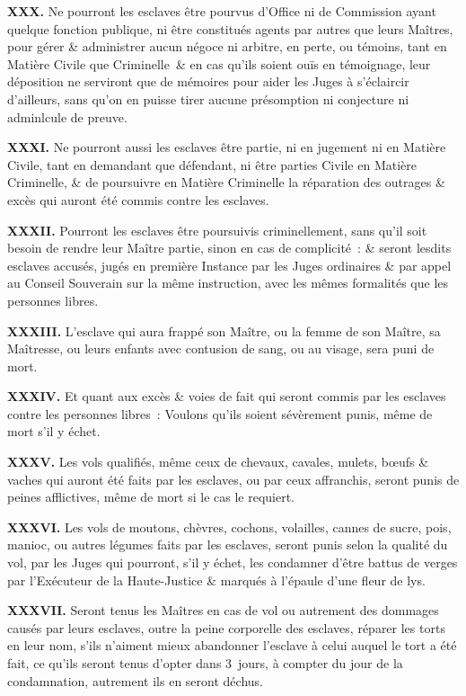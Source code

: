 \documentclass[french,twoside]{book} %
\newcommand{\labelchar}[1]{\textbf{\color{rubric} #1}}
\begin{document}
\labelchar{XXX.} Ne pourront les esclaves être pourvus d’Office ni de Commission ayant quelque fonction publique, ni être constitués agents par autres que leurs Maîtres, pour gérer \& administrer aucun négoce ni arbitre, en perte, ou témoins, tant en Matière Civile que Criminelle \& en cas qu’ils soient ouïs en témoignage, leur déposition ne serviront que de mémoires pour aider les Juges à s’éclaircir d’ailleurs, sans qu’on en puisse tirer aucune présomption ni conjecture ni adminlcule de preuve.\par
\labelchar{XXXI.} Ne pourront aussi les esclaves être partie, ni en jugement ni en Matière Civile, tant en demandant que défendant, ni être parties Civile en Matière Criminelle, \& de poursuivre en Matière Criminelle la réparation des outrages \& excès qui auront été commis contre les esclaves.\par
\labelchar{XXXII.} Pourront les esclaves être poursuivis criminellement, sans qu’il soit besoin de rendre leur Maître partie, sinon en cas de complicité : \& seront lesdits esclaves accusés, jugés en première Instance par les Juges ordinaires \& par appel au Conseil Souverain sur la même instruction, avec les mêmes formalités que les personnes libres.\par
\labelchar{XXXIII.} L’esclave qui aura frappé son Maître, ou la femme de son Maître, sa Maîtresse, ou leurs enfants avec contusion de sang, ou au visage, sera puni de mort.\par
\labelchar{XXXIV.} Et quant aux excès \& voies de fait qui seront commis par les esclaves contre les personnes libres : Voulons qu’ils soient sévèrement punis, même de mort s’il y échet.\par
\labelchar{XXXV.} Les vols qualifiés, même ceux de chevaux, cavales, mulets, bœufs \& vaches qui auront été faits par les esclaves, ou par ceux affranchis, seront punis de peines afflictives, même de mort si le cas le requiert.\par
\labelchar{XXXVI.} Les vols de moutons, chèvres, cochons, volailles, cannes de sucre, pois, manioc, ou autres légumes faits par les esclaves, seront punis selon la qualité du vol, par les Juges qui pourront, s’il y échet, les condamner d’être battus de verges par l’Exécuteur de la Haute-Justice \& marqués à l’épaule d’une fleur de lys.\par
\labelchar{XXXVII.} Seront tenus les Maîtres en cas de vol ou autrement des dommages causés par leurs esclaves, outre la peine corporelle des esclaves, réparer les torts en leur nom, s’ils n’aiment mieux abandonner l’esclave à celui auquel le tort a été fait, ce qu’ils seront tenus d’opter dans 3 jours, à compter du jour de la condamnation, autrement ils en seront déchus.\par
\end{document}
